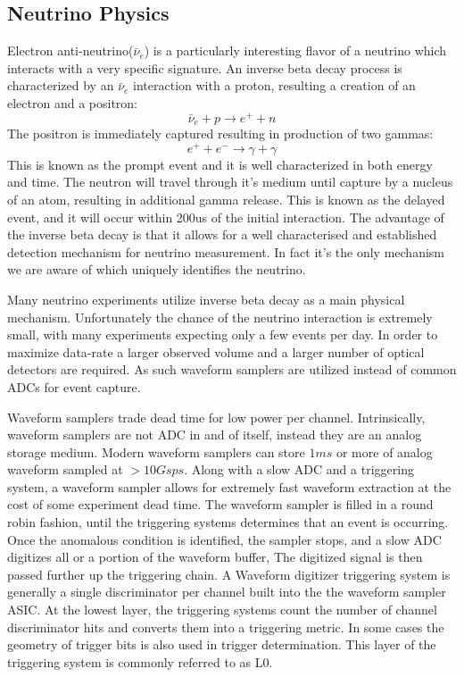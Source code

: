 \subsection{Neutrino Physics}\label{subsec:neutrino-physics}
Electron anti-neutrino($\bar{\nu}_e$) is a particularly interesting flavor of a neutrino which interacts with a very specific signature.
An inverse beta decay process is characterized by an $\bar{\nu}_e$ interaction with a proton, resulting a creation of an electron and a positron:
\begin{equation}
    \bar{\nu}_e+p\rightarrow e^++n
\end{equation}
The positron is immediately captured resulting in production of two gammas:
\begin{equation}
    e^+ +e^- \rightarrow \gamma + \gamma
\end{equation}
This is known as the prompt event and it is well characterized in both energy and time.
The neutron will travel through it's medium until capture by a nucleus of an atom, resulting in additional gamma release.
This is known as the delayed event, and it will occur within 200us of the initial interaction.
The advantage of the inverse beta decay is that it allows for a well characterised and established detection mechanism for neutrino measurement.
In fact it's the only mechanism we are aware of which uniquely identifies the neutrino.

Many neutrino experiments utilize inverse beta decay as a main physical mechanism.\cite{abe2008precision}\cite{li2016invited}
Unfortunately the chance of the neutrino interaction is extremely small, with many experiments expecting only a few events per day.
In order to maximize data-rate a larger observed volume and a larger number of optical detectors are required.
As such waveform samplers are utilized instead of common ADCs for event capture.

Waveform samplers trade dead time for low power per channel.
Intrinsically, waveform samplers are not ADC in and of itself, instead they are an analog storage medium.
Modern waveform samplers can store $1ms$ or more of analog waveform sampled at $>10Gsps$.
Along with a slow ADC and a triggering system, a waveform sampler allows for extremely fast waveform extraction at the cost of some experiment dead time.
The waveform sampler is filled in a round robin fashion, until the triggering systems determines that an event is occurring.
Once the anomalous condition is identified, the sampler stops, and a slow ADC digitizes all or a portion of the waveform buffer,
The digitized signal is then passed further up the triggering chain.
A Waveform digitizer triggering system is generally a single discriminator per channel built into the the waveform sampler ASIC.
At the lowest layer, the triggering systems count the number of channel discriminator hits and converts them into a triggering metric.
In some cases the geometry of trigger bits is also used in trigger determination.
This layer of the triggering system is commonly referred to as L0.

